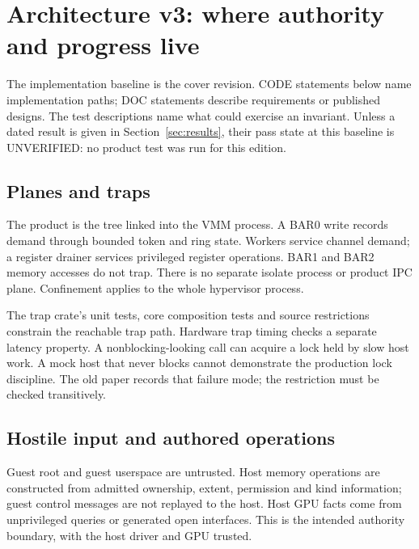 \section{Architecture v3: where authority and progress live}
\label{sec:architecture}

The implementation baseline is the cover revision. CODE statements below name implementation
paths; DOC statements describe requirements or published designs. The test descriptions name
what could exercise an invariant. Unless a dated result is given in Section~\ref{sec:results},
their pass state at this baseline is UNVERIFIED: no product test was run for this edition.

\subsection{Planes and traps}

\doc The product is the  tree linked into the VMM process. A BAR0 write
records demand through bounded token and ring state. Workers service channel demand; a
register drainer services privileged register operations. BAR1 and BAR2 memory accesses do not
trap. There is no separate isolate process or product IPC plane. Confinement applies to the
whole hypervisor process.

{The trap crate's unit tests, core composition tests and source restrictions constrain the
reachable trap path. Hardware trap timing checks a separate latency property.}
{A nonblocking-looking call can acquire a lock held by slow host work. A mock host that never
blocks cannot demonstrate the production lock discipline. The old paper records that failure
mode; the restriction must be checked transitively.}

\subsection{Hostile input and authored operations}

\doc Guest root and guest userspace are untrusted. Host memory operations are constructed
from admitted ownership, extent, permission and kind information; guest control messages are
not replayed to the host. Host GPU facts come from unprivileged queries or generated open
interfaces. This is the intended authority boundary, with the host driver and GPU trusted.

